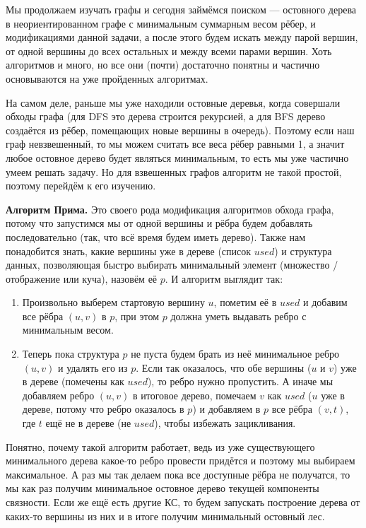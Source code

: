 Мы продолжаем изучать графы и сегодня займёмся поиском  — остовного дерева в неориентированном графе с минимальным суммарным весом рёбер, и модификациями данной задачи, а после этого будем искать  между парой вершин, от одной вершины до всех остальных и между всеми парами вершин. Хоть алгоритмов и много, но все они (почти) достаточно понятны и частично основываются на уже пройденных алгоритмах.


На самом деле, раньше мы уже находили остовные деревья, когда совершали обходы графа (для DFS это дерева строится рекурсией, а для BFS дерево создаётся из рёбер, помещающих новые вершины в очередь). Поэтому если наш граф невзвешенный, то мы можем считать все веса рёбер равными 1, а значит любое остовное дерево будет являться минимальным, то есть мы уже частично умеем решать задачу. Но для взвешенных графов алгоритм не такой простой, поэтому перейдём к его изучению.

\textbf{Алгоритм Прима.} Это своего рода модификация алгоритмов обхода графа, потому что запустимся мы от одной вершины и рёбра будем добавлять последовательно (так, что всё время будем иметь дерево). Также нам понадобится знать, какие вершины уже в дереве (список $used$) и структура данных, позволяющая быстро выбирать минимальный элемент (множество / отображение или куча), назовём её $p$. И алгоритм выглядит так:

\begin{enumerate}
    \item Произвольно выберем стартовую вершину $u$, пометим её в $used$ и добавим все рёбра $(u, v)$ в $p$, при этом $p$ должна уметь выдавать ребро с минимальным весом.
    \item Теперь пока структура $p$ не пуста будем брать из неё минимальное ребро $(u, v)$ и удалять его из $p$. Если так оказалось, что обе вершины ($u$ и $v$) уже в дереве (помечены как $used$), то ребро нужно пропустить. А иначе мы добавляем ребро $(u, v)$ в итоговое дерево, помечаем $v$ как $used$ ($u$ уже в дереве, потому что ребро оказалось в $p$) и добавляем в $p$ все рёбра $(v, t)$, где $t$ ещё не в дереве (не $used$), чтобы избежать зацикливания.
\end{enumerate}

Понятно, почему такой алгоритм работает, ведь из уже существующего минимального дерева какое-то ребро провести придётся и поэтому мы выбираем максимальное. А раз мы так делаем пока все доступные рёбра не получатся, то мы как раз получим минимальное остовное дерево текущей компоненты связности. Если же ещё есть другие КС, то будем запускать построение дерева от каких-то вершины из них и в итоге получим минимальный остовный лес.

